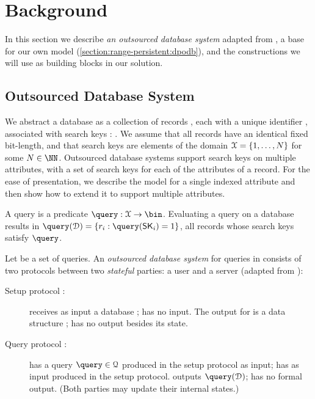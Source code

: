 \section{Background}\label{section:range-persistent:background}

	In this section we describe \emph{an outsourced database system} adapted from \cite{generic-attacks-kellaris}, a base for our own model (\cref{section:range-persistent:dpodb}), and the constructions we will use as building blocks in our solution.

	\subsection{Outsourced Database System}

		We abstract a database as a collection of \dataSize{} records \record{}, each with a unique identifier \recordID{}, associated with search keys \searchKey{}: \databaseDef{}.
		We assume that all records have an identical fixed bit-length, and that search keys are elements of the domain $\mathcal{X} = \{ 1, \ldots, N \}$ for some $\domainSize \in \NN$.
		Outsourced database systems support search keys on multiple attributes, with a set of search keys for each of the attributes of a record.
		For the ease of presentation, we describe the model for a single indexed attribute and then show how to extend it to support multiple attributes.

		A query is a predicate $\query: \searchKeyDomain \to \bin$.
		Evaluating a query \query{} on a database \database{} results in $\query( \database ) = \{ \record_i : \query( \searchKey_i ) = 1 \}$, all records whose search keys satisfy $\query$.

		Let \querySet{} be a set of queries.
		An \emph{outsourced database system} for queries in \querySet{} consists of two protocols between two \emph{stateful} parties: a user \user{} and a server \server{} (adapted from \cite{generic-attacks-kellaris}): %
		\begin{description}
			\item[Setup protocol \protocolSetup{}:]
				\user{} receives as input a database \databaseDef{}; \server{} has no input.
				The output for \server{} is a data structure \serverDS{}; \user{} has no output besides its state.

			\item[Query protocol \protocolQuery{}:]
				\user{} has a query $\query \in \querySet$ produced in the setup protocol as input; \server{} has as input \serverDS{} produced in the setup protocol.
				\user{} outputs $\query( \database )$; \server{} has no formal output.
				(Both parties may update their internal states.)
		\end{description}

